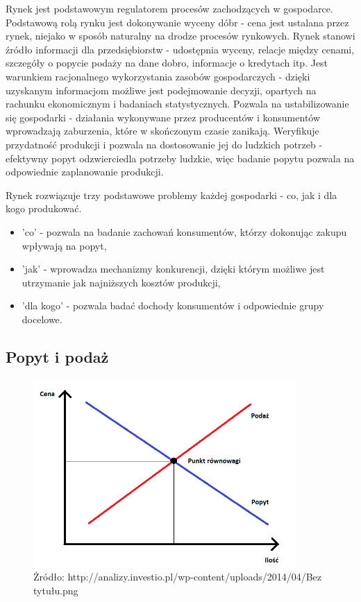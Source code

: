 \documentclass[12pt]{extarticle}
\begin{document}
Rynek jest podstawowym regulatorem procesów zachodzących w gospodarce. Podstawową rolą rynku jest dokonywanie wyceny dóbr - cena jest ustalana przez rynek, niejako w sposób naturalny na drodze procesów rynkowych. Rynek stanowi źródło informacji dla przedsiębiorstw - udostępnia wyceny, relacje między cenami, szczegóły o popycie podaży na dane dobro, informacje o kredytach itp. Jest warunkiem racjonalnego wykorzystania zasobów gospodarczych - dzięki uzyskanym informacjom możliwe jest podejmowanie decyzji, opartych na rachunku ekonomicznym i badaniach statystycznych. Pozwala na ustabilizowanie się gospodarki - działania wykonywane przez producentów i konsumentów wprowadzają zaburzenia, które w skończonym czasie zanikają. Weryfikuje przydatność produkcji i pozwala na dostosowanie jej do ludzkich potrzeb - efektywny popyt odzwierciedla potrzeby ludzkie, więc badanie popytu pozwala na odpowiednie zaplanowanie produkcji.

Rynek rozwiązuje trzy podstawowe problemy każdej gospodarki - co, jak i dla kogo produkować.

\begin{itemize}
	\item 'co' - pozwala na badanie zachowań konsumentów, którzy dokonując zakupu wpływają na popyt,
	\item 'jak' - wprowadza mechanizmy konkurencji, dzięki którym możliwe jest utrzymanie jak najniższych kosztów produkcji,
    \item 'dla kogo' - pozwala badać dochody konsumentów i odpowiednie grupy docelowe.
\end{itemize}

\subsection{Popyt i podaż}


\begin{figure}[H]
\centering
\includegraphics[width=10cm]{popyt_podaz}
    \caption{Żródło: http://analizy.investio.pl/wp-content/uploads/2014/04/Bez tytułu.png}
\end{figure}
\end{document}
